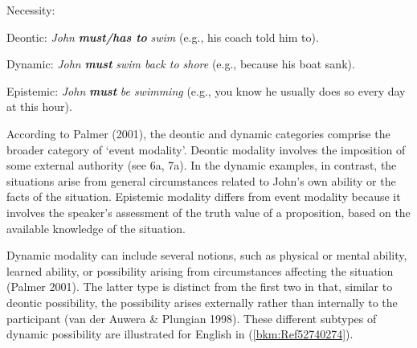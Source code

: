 \begin{listWWNumiileveli}
\item 
\begin{stylelsLanginfo}
Necessity:
\end{stylelsLanginfo}

\begin{listWWNumiilevelii}
\item 
\begin{stylelsLanginfo}
Deontic: \textit{John }\textbf{\textit{must/has to}}\textit{ swim} (e.g., his coach told him to).
\end{stylelsLanginfo}
\item 
\begin{stylelsLanginfo}
Dynamic: \textit{John }\textbf{\textit{must}}\textit{ swim back to shore} (e.g., because his boat sank).
\end{stylelsLanginfo}
\item 
\begin{stylelsLanginfo}
Epistemic: \textit{John }\textbf{\textit{must}}\textit{ be swimming} (e.g., you know he usually does so every day at this hour).
\end{stylelsLanginfo}
\end{listWWNumiilevelii}
\end{listWWNumiileveli}
\begin{styleStandard}
According to Palmer (2001), the deontic and dynamic categories comprise the broader category of ‘event modality’. Deontic modality involves the imposition of some external authority (see 6a, 7a). In the dynamic examples, in contrast, the situations arise from general circumstances related to John’s own ability or the facts of the situation. Epistemic modality differs from event modality because it involves the speaker’s assessment of the truth value of a proposition, based on the available knowledge of the situation.
\end{styleStandard}

\begin{styleStandard}
Dynamic modality can include several notions, such as physical or mental ability, learned ability, or possibility arising from circumstances affecting the situation (Palmer 2001). The latter type is distinct from the first two in that, similar to deontic possibility, the possibility arises externally rather than internally to the participant (van der Auwera \& Plungian 1998). These different subtypes of dynamic possibility are illustrated for English in (\ref{bkm:Ref52740274}).
\end{styleStandard}

